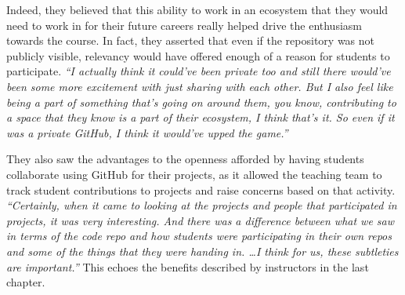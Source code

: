 
Indeed, they believed that this ability to work in an ecosystem that they would need to work in for their future careers really helped drive the enthusiasm towards the course. In fact, they asserted that even if the repository was not publicly visible, relevancy would have offered enough of a reason for students to participate. \textit{``I actually think it could've been private too and still there would've been some more excitement with just sharing with each other. But I also feel like being a part of something that's going on around them, you know, contributing to a space that they know is a part of their ecosystem, I think that's it. So even if it was a private GitHub, I think it would've upped the game.''}


They also saw the advantages to the openness afforded by having students collaborate using GitHub for their projects, as it allowed the teaching team to track student contributions to projects and raise concerns based on that activity. \textit{``Certainly, when it came to looking at the projects and people that participated in projects, it was very interesting. And there was a difference between what we saw in terms of the code repo and how students were participating in their own repos and some of the things that they were handing in. \ldots I think for us, these subtleties are important.''}
This echoes the benefits described by instructors in the last chapter.


